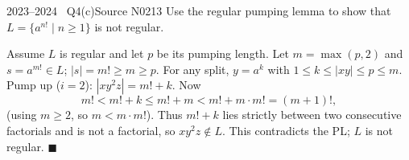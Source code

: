 \documentclass[11pt,a4paper]{article}
\begin{document}
\begin{question}{2023--2024 \textbullet\ Q4(c)}{Source N02}{13}
Use the regular pumping lemma to show that $L=\{a^{n!}\mid n\ge1\}$ is not regular.
\end{question}
\begin{solution}
Assume $L$ is regular and let $p$ be its pumping length. Let $m=\max(p,2)$ and $s=a^{m!}\in L$; $|s|=m!\ge m\ge p$. For any split, $y=a^k$ with $1\le k\le|xy|\le p\le m$. Pump up ($i=2$): $|xy^2z|=m!+k$. Now
\[ m!<m!+k\le m!+m<m!+m\cdot m!=(m+1)!, \]
(using $m\ge2$, so $m<m\cdot m!$). Thus $m!+k$ lies strictly between two consecutive factorials and is not a factorial, so $xy^2z\notin L$. This contradicts the PL; $L$ is not regular. \hfill$\blacksquare$
\end{solution}
\end{document}
